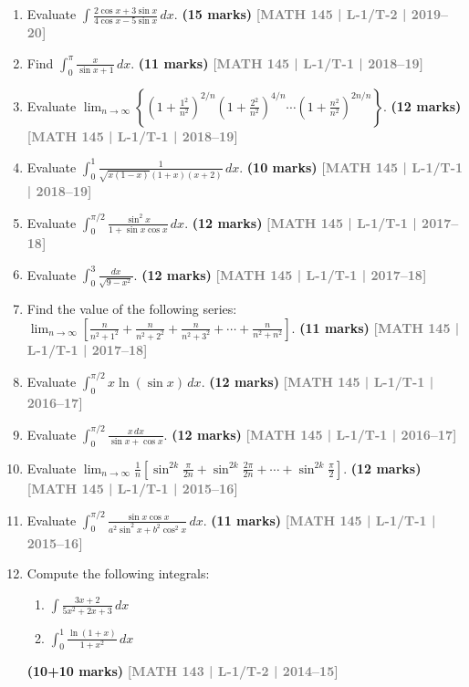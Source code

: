 \documentclass[12pt,a4paper]{article}
\newcommand{\yr}[1]{\hfill\textcolor{gray}{\small\textbf{[#1]}}}
\newcommand{\mk}[1]{\textcolor{orange!70!black}{\small\textbf{(#1 marks)}}}
\begin{document}
\begin{enumerate}
\item Evaluate $\displaystyle\int\frac{2\cos x+3\sin x}{4\cos x-5\sin x}\,dx$.
\mk{15} \yr{MATH 145 | L-1/T-2 | 2019--20}

\item Find $\displaystyle\int_{0}^{\pi}\frac{x}{\sin x+1}\,dx$.
\mk{11} \yr{MATH 145 | L-1/T-1 | 2018--19}

\item Evaluate $\displaystyle\lim_{n\to\infty}\left\{\left(1+\frac{1^{2}}{n^{2}}\right)^{2/n}\!\!\left(1+\frac{2^{2}}{n^{2}}\right)^{4/n}\!\!\cdots\left(1+\frac{n^{2}}{n^{2}}\right)^{2n/n}\right\}$.
\mk{12} \yr{MATH 145 | L-1/T-1 | 2018--19}

\item Evaluate $\displaystyle\int_{0}^{1}\frac{1}{\sqrt{x(1-x)}{(1+x)(x+2)}}\,dx$.
\mk{10} \yr{MATH 145 | L-1/T-1 | 2018--19}

\item Evaluate $\displaystyle\int_{0}^{\pi/2}\frac{\sin^{2}x}{1+\sin x\cos x}\,dx$.
\mk{12} \yr{MATH 145 | L-1/T-1 | 2017--18}

\item Evaluate $\displaystyle\int_{0}^{3}\frac{dx}{\sqrt{9-x^{2}}}$.
\mk{12} \yr{MATH 145 | L-1/T-1 | 2017--18}

\item Find the value of the following series: $\displaystyle\lim_{n\to\infty}\left[\frac{n}{n^{2}+1^{2}}+\frac{n}{n^{2}+2^{2}}+\frac{n}{n^{2}+3^{2}}+\cdots+\frac{n}{n^{2}+n^{2}}\right]$.
\mk{11} \yr{MATH 145 | L-1/T-1 | 2017--18}

\item Evaluate $\displaystyle\int_{0}^{\pi/2}x\ln(\sin x)\,dx$.
\mk{12} \yr{MATH 145 | L-1/T-1 | 2016--17}

\item Evaluate $\displaystyle\int_{0}^{\pi/2}\frac{x\,dx}{\sin x+\cos x}$.
\mk{12} \yr{MATH 145 | L-1/T-1 | 2016--17}

\item Evaluate $\displaystyle\lim_{n\to\infty}\frac{1}{n}\left[\sin^{2k}\!\frac{\pi}{2n}+\sin^{2k}\!\frac{2\pi}{2n}+\cdots+\sin^{2k}\!\frac{\pi}{2}\right]$.
\mk{12} \yr{MATH 145 | L-1/T-1 | 2015--16}

\item Evaluate $\displaystyle\int_{0}^{\pi/2}\frac{\sin x\cos x}{a^{2}\sin^{2}x+b^{2}\cos^{2}x}\,dx$.
\mk{11} \yr{MATH 145 | L-1/T-1 | 2015--16}

\item Compute the following integrals:
\begin{enumerate}
  \item $\displaystyle\int \frac{3x+2}{{5x^{2}+2x+3}}\,dx$
  \item $\displaystyle\int_{0}^{1}\frac{\ln(1+x)}{1+x^{2}}\,dx$
\end{enumerate}
\mk{10+10} \yr{MATH 143 | L-1/T-2 | 2014--15}


\end{enumerate}
\end{document}
